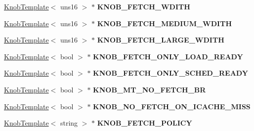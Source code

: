 \begin{DoxyCompactItemize}
\item 
\hypertarget{classall__knobs__c_ac47250433e3cdd98172d0243c68a6ac3}{
\hyperlink{classKnobTemplate}{KnobTemplate}$<$ uns16 $>$ $\ast$ {\bfseries KNOB\_\-FETCH\_\-WDITH}}
\label{classall__knobs__c_ac47250433e3cdd98172d0243c68a6ac3}

\item 
\hypertarget{classall__knobs__c_a5f67774fb87076e45d13f7d6ecbfeaf3}{
\hyperlink{classKnobTemplate}{KnobTemplate}$<$ uns16 $>$ $\ast$ {\bfseries KNOB\_\-FETCH\_\-MEDIUM\_\-WDITH}}
\label{classall__knobs__c_a5f67774fb87076e45d13f7d6ecbfeaf3}

\item 
\hypertarget{classall__knobs__c_ad9df27a20761cdba3be0fdc654fa3db1}{
\hyperlink{classKnobTemplate}{KnobTemplate}$<$ uns16 $>$ $\ast$ {\bfseries KNOB\_\-FETCH\_\-LARGE\_\-WDITH}}
\label{classall__knobs__c_ad9df27a20761cdba3be0fdc654fa3db1}

\item 
\hypertarget{classall__knobs__c_ab2af79488c21c516aa70ab58efbc2d9a}{
\hyperlink{classKnobTemplate}{KnobTemplate}$<$ bool $>$ $\ast$ {\bfseries KNOB\_\-FETCH\_\-ONLY\_\-LOAD\_\-READY}}
\label{classall__knobs__c_ab2af79488c21c516aa70ab58efbc2d9a}

\item 
\hypertarget{classall__knobs__c_a6a85141898efa4769023d806dd641189}{
\hyperlink{classKnobTemplate}{KnobTemplate}$<$ bool $>$ $\ast$ {\bfseries KNOB\_\-FETCH\_\-ONLY\_\-SCHED\_\-READY}}
\label{classall__knobs__c_a6a85141898efa4769023d806dd641189}

\item 
\hypertarget{classall__knobs__c_abb6f899fc1427bdfe36233d2fb9b42e1}{
\hyperlink{classKnobTemplate}{KnobTemplate}$<$ bool $>$ $\ast$ {\bfseries KNOB\_\-MT\_\-NO\_\-FETCH\_\-BR}}
\label{classall__knobs__c_abb6f899fc1427bdfe36233d2fb9b42e1}

\item 
\hypertarget{classall__knobs__c_af1114242075b34275a9b55777e79df98}{
\hyperlink{classKnobTemplate}{KnobTemplate}$<$ bool $>$ $\ast$ {\bfseries KNOB\_\-NO\_\-FETCH\_\-ON\_\-ICACHE\_\-MISS}}
\label{classall__knobs__c_af1114242075b34275a9b55777e79df98}

\item 
\hypertarget{classall__knobs__c_ac946a6fd9e94eb80ae74170daaf9fd4b}{
\hyperlink{classKnobTemplate}{KnobTemplate}$<$ string $>$ $\ast$ {\bfseries KNOB\_\-FETCH\_\-POLICY}}
\label{classall__knobs__c_ac946a6fd9e94eb80ae74170daaf9fd4b}


\end{DoxyCompactItemize}
